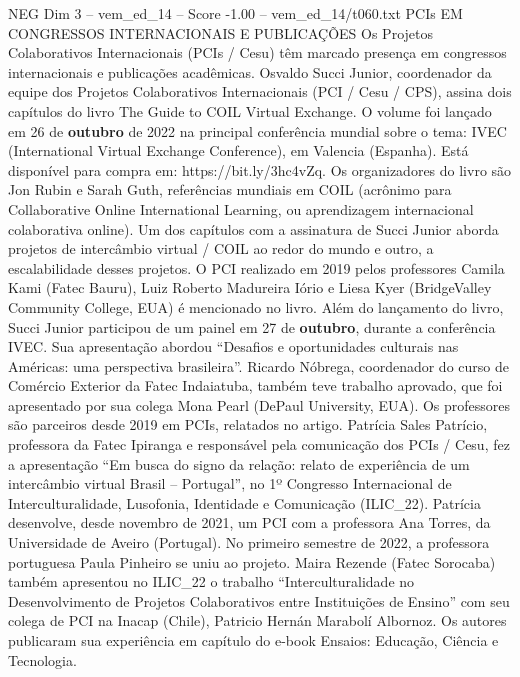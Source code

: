\begin{textsample}{NEG Dim 3 – vem\_ed\_14 – Score -1.00 – vem\_ed\_14/t060.txt}  \label{ex:f3_neg_063}
PCIs EM CONGRESSOS INTERNACIONAIS E PUBLICAÇÕES Os Projetos Colaborativos Internacionais (PCIs / Cesu) têm marcado presença em congressos internacionais e publicações acadêmicas.
Osvaldo Succi Junior, coordenador da equipe dos Projetos Colaborativos Internacionais (PCI / Cesu / CPS), assina dois capítulos do livro The Guide to COIL Virtual Exchange.
O volume foi lançado em 26 de \textbf{outubro} de 2022 na principal conferência mundial sobre o tema: IVEC (International Virtual Exchange Conference), em Valencia (Espanha).
Está disponível para compra em: https://bit.ly/3hc4vZq.
Os organizadores do livro são Jon Rubin e Sarah Guth, referências mundiais em COIL (acrônimo para Collaborative Online International Learning, ou aprendizagem internacional colaborativa online).
Um dos capítulos com a assinatura de Succi Junior aborda projetos de intercâmbio virtual / COIL ao redor do mundo e outro, a escalabilidade desses projetos.
O PCI realizado em 2019 pelos professores Camila Kami (Fatec Bauru), Luiz Roberto Madureira Iório e Liesa Kyer (BridgeValley Community College, EUA) é mencionado no livro.
Além do lançamento do livro, Succi Junior participou de um painel em 27 de \textbf{outubro}, durante a conferência IVEC.
Sua apresentação abordou “Desafios e oportunidades culturais nas Américas: uma perspectiva brasileira”.
Ricardo Nóbrega, coordenador do curso de Comércio Exterior da Fatec Indaiatuba, também teve trabalho aprovado, que foi apresentado por sua colega Mona Pearl (DePaul University, EUA).
Os professores são parceiros desde 2019 em PCIs, relatados no artigo.
Patrícia Sales Patrício, professora da Fatec Ipiranga e responsável pela comunicação dos PCIs / Cesu, fez a apresentação “Em busca do signo da relação: relato de experiência de um intercâmbio virtual Brasil – Portugal”, no 1º Congresso Internacional de Interculturalidade, Lusofonia, Identidade e Comunicação (ILIC\_22).
Patrícia desenvolve, desde novembro de 2021, um PCI com a professora Ana Torres, da Universidade de Aveiro (Portugal).
No primeiro semestre de 2022, a professora portuguesa Paula Pinheiro se uniu ao projeto.
Maira Rezende (Fatec Sorocaba) também apresentou no ILIC\_22 o trabalho “Interculturalidade no Desenvolvimento de Projetos Colaborativos entre Instituições de Ensino” com seu colega de PCI na Inacap (Chile), Patricio Hernán Marabolí Albornoz.
Os autores publicaram sua experiência em capítulo do e-book Ensaios: Educação, Ciência e Tecnologia.

\end{textsample}
